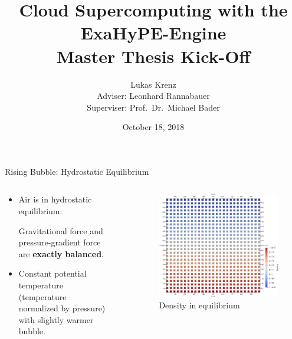 \documentclass{beamer}
\title{Cloud Supercomputing with the ExaHyPE-Engine\\Master Thesis Kick-Off}
\author{Lukas Krenz\\Adviser: Leonhard Rannabauer\\Superviser: Prof.\ Dr.\ Michael Bader}
\date{October 18, 2018}
\institute{\textsc{tum}, Chair for Scientific Computing}
\begin{document}
\maketitle
\begin{frame}{Rising Bubble: Hydrostatic Equilibrium}
  \begin{columns}
    \begin{column}[t]{0.5\textwidth}
      \begin{itemize}
      \item 
  Air is in hydrostatic equilibrium:

  Gravitational force and pressure-gradient force are \textbf{exactly balanced}.

  \item Constant potential temperature (temperature normalized by pressure) with slightly warmer bubble.
        
  \end{itemize}
    \end{column}~%
    \begin{column}[t]{0.5\textwidth}
      \begin{figure}[h]
\includegraphics[width=1.0\textwidth]{hydrostatic_density}
\caption{Density in equilibrium}
\end{figure}
    \end{column}
  \end{columns}
\end{frame}
\end{document}
